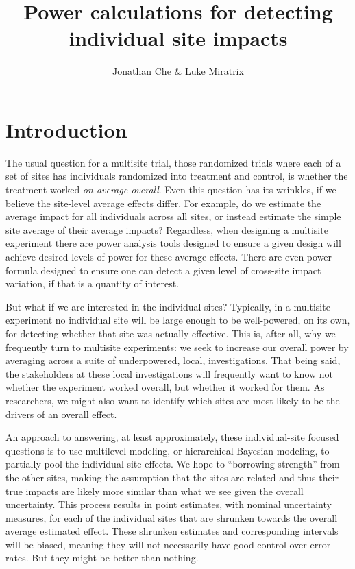 \documentclass[]{article}
\title{Power calculations for detecting \\ individual site impacts}
\author{Jonathan Che \& Luke Miratrix}
\begin{document}
	
	\maketitle
	
	
	
	\section{Introduction}
	
	The usual question for a multisite trial, those randomized trials where each of a set of sites has individuals randomized into treatment and control, is whether the treatment worked \emph{on average overall}.
	Even this question has its wrinkles, if we believe the site-level average effects differ.
	For example, do we estimate the average impact for all individuals across all sites, or instead estimate the simple site average of their average impacts?
	Regardless, when designing a multisite experiment there are power analysis tools designed to ensure a given design will achieve desired levels of power for these average effects.
	There are even power formula designed to ensure one can detect a given level of cross-site impact variation, if that is a quantity of interest.
	
	But what if we are interested in the individual sites?
	Typically, in a multisite experiment no individual site will be large enough to be well-powered, on its own, for detecting whether that site was actually effective.
	This is, after all, why we frequently turn to multisite experiments: we seek to increase our overall power by averaging across a suite of underpowered, local, investigations.
	That being said, the stakeholders at these local investigations will frequently want to know not whether the experiment worked overall, but whether it worked for them.
	As researchers, we might also want to identify which sites are most likely to be the drivers of an overall effect.
	
	An approach to answering, at least approximately, these individual-site focused questions is to use multilevel modeling, or hierarchical Bayesian modeling, to partially pool the individual site effects.
	We hope to ``borrowing strength'' from the other sites, making the assumption that the sites are related and thus their true impacts are likely more similar than what we see given the overall uncertainty.
	This process results in point estimates, with nominal uncertainty measures, for each of the individual sites that are shrunken towards the overall average estimated effect.
	These shrunken estimates and corresponding intervals will be biased, meaning they will not necessarily have good control over error rates.
	But they might be better than nothing.
	
\end{document}
